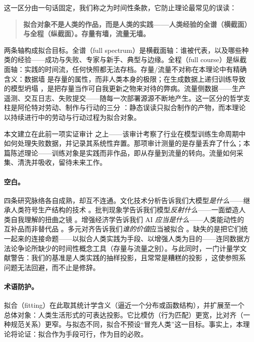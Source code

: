 \documentclass[10pt,fontset=fandol]{ctexart}
\begin{document}
这一区分由一句话固定，我们称之为时间性条款，它防止理论最常见的误读：

\begin{quote}
\textbf{拟合对象不是人类的作品，而是人类的实践——人类经验的全谱（横截面）与全程（纵截面）。存量有墙，流量无墙。}
\end{quote}

两条轴构成拟合目标。全谱（full spectrum）是横截面轴：谁被代表，以及哪些种类的经验——成功与失败、专家与新手、典型与边缘。全程（full course）是纵截面轴：实践的时间流，任何快照都无法存档。存量/流量不对称在本理论中有精确含义：数据墙 \cite{villalobos2022data} 是存量的属性，而非人类本身的极限；在生成数据上递归训练导致的模型坍塌 \cite{shumailov2024collapse}，是把存量当作可自我更新之物来对待的弊病。流量侧数据——生产遥测、交互日志、失败提交——随每一次部署源源不断地产生。这一区分的哲学支柱是阿伦特对劳动、制作与行动的三分 \cite{arendt1958human}：静态误读只拟合制作的产物，而本理论以持续进行中的劳动与行动过程为拟合对象。

本文建立在此前一项实证审计 \cite{yu2026failure} 之上——该审计考察了行业在模型训练生命周期中如何处理失败数据，并记录其系统性弃置。那项审计测量的是存量丢弃了什么；本篇陈述理论——训练对象是实践而非作品，即从存量到流量的转向。流量如何采集、清洗并吸收，留待未来工作。

\paragraph{空白。}
四条研究脉络各自成熟，却互不连通。文化技术分析告诉我们大模型\emph{是什么}——继承人类符号生产结构的技术 \cite{farrell2025cultural}。批判现象学告诉我们模型\emph{反射什么}——一面塑造人类自我理解的扭曲之镜 \cite{vallor2024mirror}。增强经济学告诉我们 AI \emph{应当是什么}——人类能动性的互补品而非替代品 \cite{brynjolfsson2022turing}。多元对齐告诉我们\emph{谁的价值}应当被拟合 \cite{gabriel2020values}。缺失的是把它们统一起来的连接命题——以拟合人类实践为手段、以增强人类为目的——连同数据方法论争论所缺少的时间性概念工具（存量与流量之别）。与此同时，一门计量学文献警告：我们的基准是人类实践的抽样投影，且常常是糟糕的投影 \cite{salaudeen2025measurement}，这使参照系问题无法回避，而不止是修辞。

\paragraph{术语防护。}
拟合（fitting）在此取其统计学含义（逼近一个分布或函数结构），并扩展至一个总体对象：人类生活形式的可表达投影。它比模仿（行为匹配）更宽，比对齐（一种规范关系）更窄。与拟态不同，拟合不预设“冒充人类”这一目标。事实上，本理论将论证：拟合作为手段可行，作为目的必败。
\end{document}
